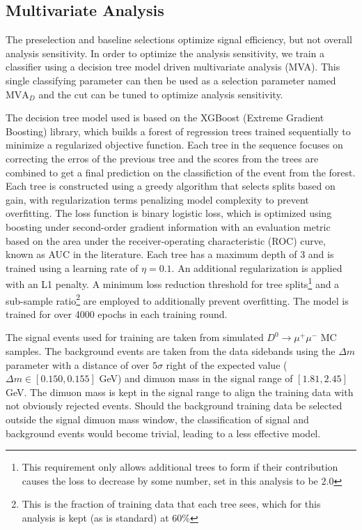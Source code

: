 

\subsection{Multivariate Analysis}
\label{subsec:mva}

The preselection and baseline selections optimize signal efficiency, but not overall analysis sensitivity. In order to optimize the analysis sensitivity, we train a classifier using a decision tree model driven multivariate analysis (MVA). This single classifying parameter can then be used as a selection parameter named $\text{MVA}_D$ and the cut can be tuned to optimize analysis sensitivity.

The decision tree model used is based on the XGBoost (Extreme Gradient Boosting) library, which builds a forest of regression trees trained sequentially to minimize a regularized objective function. Each tree in the sequence focuses on correcting the erros of the previous tree and the scores from the trees are combined to get a final prediction on the classifiction of the event from the forest. Each tree is constructed using a greedy algorithm that selects splits based on gain, with regularization terms penalizing model complexity to prevent overfitting. The loss function is binary logistic loss, which is optimized using boosting under second-order gradient information with an evaluation metric based on the area under the receiver-operating characteristic (ROC) curve, known as AUC in the literature. Each tree has a maximum depth of 3 and is trained using a learning rate of $\eta = 0.1$. An additional regularization is applied with an L1 penalty. A minimum loss reduction threshold for tree splits\footnote{This requirement only allows additional trees to form if their contribution causes the loss to decrease by some number, set in this analysis to be $2.0$} and a sub-sample ratio\footnote{This is the fraction of training data that each tree sees, which for this analysis is kept (as is standard) at $60\%$} are employed to additionally prevent overfitting. The model is trained for over 4000 epochs in each training round.

The signal events used for training are taken from simulated $D^0 \to \mu^+ \mu^-$ MC samples. The background events are taken from the data sidebands using the $\Delta m$ parameter with a distance of over $5\sigma$ right of the expected value ($\Delta m \in [0.150, 0.155]$ GeV) and dimuon mass in the signal range of $[1.81, 2.45]$ GeV. The dimuon mass is kept in the signal range to align the training data with not obviously rejected events. Should the background training data be selected outside the signal dimuon mass window, the classification of signal and background events would become trivial, leading to a less effective model.

